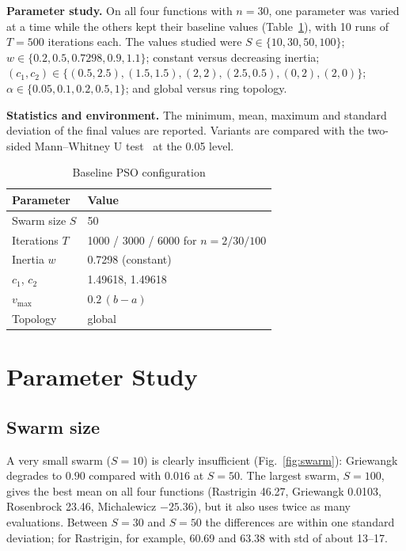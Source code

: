 \documentclass[conference]{IEEEtran}
\begin{document}
\textbf{Parameter study.} On all four functions with $n=30$, one parameter
was varied at a time while the others kept their baseline values
(Table~\ref{tab:params}), with 10 runs of $T=500$ iterations each. The
values studied were $S\in\{10,30,50,100\}$; $w\in\{0.2,0.5,0.7298,0.9,
1.1\}$; constant versus decreasing inertia;
$(c_1,c_2)\in\{(0.5,2.5),(1.5,1.5),(2,2),(2.5,0.5),(0,2),(2,0)\}$;
$\alpha\in\{0.05,0.1,0.2,0.5,1\}$; and global versus ring topology.

\textbf{Statistics and environment.} The minimum, mean, maximum and
standard deviation of the final values are reported. Variants are
compared with the two-sided Mann--Whitney U test~\cite{mann1947} at the
0.05 level.

\begin{table}[t]
\centering
\caption{Baseline PSO configuration}
\label{tab:params}
\begin{tabular}{ll}
\toprule
Parameter & Value\\
\midrule
Swarm size $S$ & 50\\
Iterations $T$ & 1000 / 3000 / 6000 for $n=2/30/100$\\
Inertia $w$ & 0.7298 (constant)\\
$c_1$, $c_2$ & 1.49618, 1.49618\\
$v_{\max}$ & $0.2\,(b-a)$\\
Topology & global\\
\bottomrule
\end{tabular}
\end{table}

\section{Parameter Study}\label{sec:study}
\subsection{Swarm size}
A very small swarm ($S=10$) is clearly insufficient
(Fig.~\ref{fig:swarm}): Griewangk degrades to $0.90$ compared with $0.016$
at $S=50$. The largest swarm, $S=100$, gives the best mean on all four
functions (Rastrigin 46.27, Griewangk 0.0103, Rosenbrock 23.46, Michalewicz
$-25.36$), but it also uses twice as many evaluations. Between $S=30$ and
$S=50$ the differences are within one standard deviation; for Rastrigin,
for example, 60.69 and 63.38 with std of about 13--17.
\end{document}
